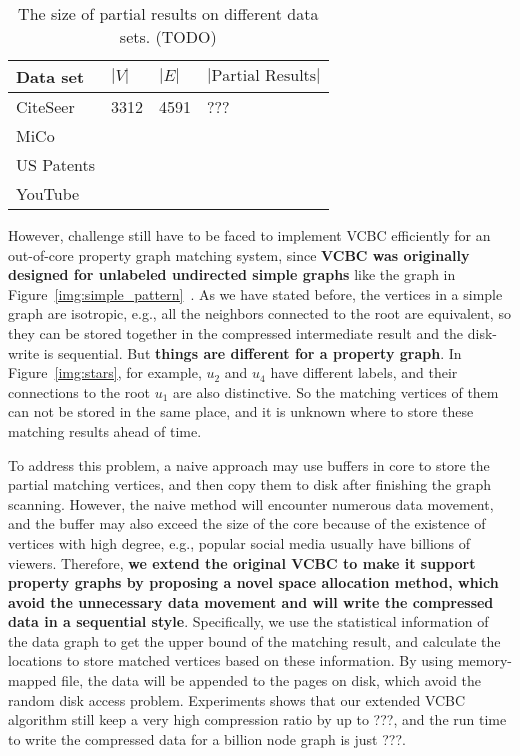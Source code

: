 \begin{table}
  \begin{tabular}{llll}
    \toprule
    Data set & $|V|$ & $|E|$ & $|\text{Partial Results}|$ \\
    \midrule
    CiteSeer & 3312 & 4591 & \@??? \\
    MiCo & & & \\
    US Patents & & & \\
    YouTube & & & \\
    \bottomrule
  \end{tabular}
  \caption{The size of partial results on different data sets. (TODO)}\label{tab:partial_results}
\end{table}
However, challenge still have to be faced to implement VCBC efficiently for an out-of-core property graph matching system,
since \textbf{VCBC was originally designed for unlabeled undirected simple graphs} like the graph in Figure~\ref{img:simple_pattern}~\cite{DBLP:journals/pvldb/QiaoZC17}.
As we have stated before, the vertices in a simple graph are isotropic,
e.g., all the neighbors connected to the root are equivalent,
so they can be stored together in the compressed intermediate result and the disk-write is sequential.
But \textbf{things are different for a property graph}.
In Figure~\ref{img:stars}, for example, $u_2$ and $u_4$ have different labels,
and their connections to the root $u_1$ are also distinctive.
So the matching vertices of them can not be stored in the same place,
and it is unknown where to store these matching results ahead of time.

To address this problem, a naive approach may use buffers in core to store the partial matching vertices,
and then copy them to disk after finishing the graph scanning.
However, the naive method will encounter numerous data movement,
and the buffer may also exceed the size of the core because of the existence of vertices with high degree,
e.g., popular social media usually have billions of viewers.
Therefore, \textbf{we extend the original VCBC to make it support property graphs by proposing a novel space allocation method,
which avoid the unnecessary data movement and will write the compressed data in a sequential style}.
Specifically, we use the statistical information of the data graph to get the upper bound of the matching result,
and calculate the locations to store matched vertices based on these information.
By using memory-mapped file, the data will be appended to the pages on disk, which avoid the random disk access problem.
Experiments shows that our extended VCBC algorithm still keep a very high compression ratio by up to \@???,
and the run time to write the compressed data for a billion node graph is just \@???.
